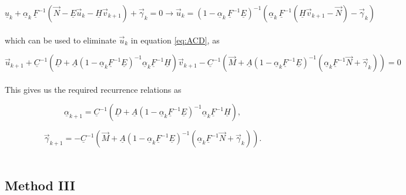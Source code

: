 \documentclass[11pt]{amsart}
\begin{document}
\begin{equation} \label{eq:IIb}
 \underline{u}_{k}  + \underline{\alpha}_{k} \, \underline{F}^{-1} \left( \vec{N}  - \underline{E} \vec{u}_{k} - \underline{H} \vec{v}_{k+1}  \right)  +  \vec{\gamma}_{k}  =  0      \longrightarrow       \vec{u}_{k}  =  \left(  1 - \underline{\alpha}_{k} \, \underline{F}^{-1} \underline{E}  \right)^{-1}     \left(   \underline{\alpha}_{k} \, \underline{F}^{-1}  \left(  \underline{H}  \vec{v}_{k+1} - \vec{N} \right) - \vec{\gamma}_{k}  \right)
\end{equation} 
\\
which can be used to eliminate $\vec{u}_{k}$ in equation \ref{eq:ACD}, as

\begin{equation} \label{eq:IIc}
\vec{u}_{k+1}  + \underline{C}^{-1} \left(  \underline{D}  + \underline{A} \left( 1 - \underline{\alpha}_{k} \underline{F}^{-1} \underline{E}  \right)^{-1} \underline{\alpha}_{k} \underline{F}^{-1} \underline{H}    \right) \vec{v}_{k+1}   -   \underline{C}^{-1} \left(  \vec{M}  +  \underline{A} \left( 1 - \underline{\alpha}_{k} \underline{F}^{-1} \underline{E}  \right)^{-1} \left(  \underline{\alpha}_{k} \underline{F}^{-1} \vec{N}  +  \vec{\gamma}_{k}   \right)  \right)   =  0
\end{equation} 
\\


This gives us the required recurrence relations as

\begin{equation} \label{eq:IIalpha}
\underline{\alpha}_{k+1}  =  \underline{C}^{-1} \left(  \underline{D}  + \underline{A} \left( 1 - \underline{\alpha}_{k} \underline{F}^{-1} \underline{E}  \right)^{-1} \underline{\alpha}_{k} \underline{F}^{-1} \underline{H}    \right) ,
\end{equation} 

\begin{equation} \label{eq:IIgamma}
\vec{\gamma}_{k+1}  =  -   \underline{C}^{-1} \left(  \vec{M}  +  \underline{A} \left( 1 - \underline{\alpha}_{k} \underline{F}^{-1} \underline{E}  \right)^{-1} \left(  \underline{\alpha}_{k} \underline{F}^{-1} \vec{N}  +  \vec{\gamma}_{k}   \right)  \right) .
\end{equation} 
\\








\subsection{Method III}
\end{document}
